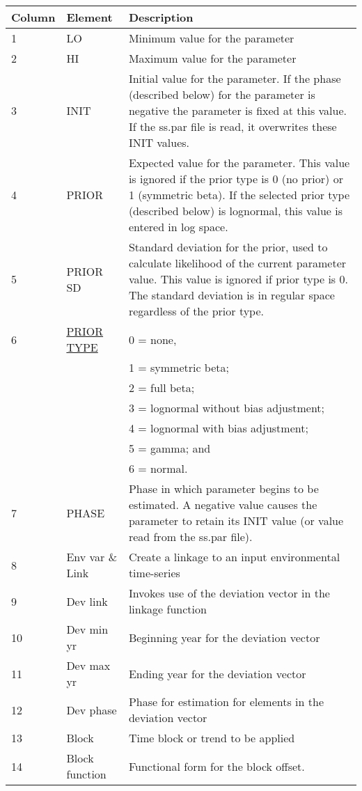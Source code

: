 \hypertarget{Priors}{} \hypertarget{paraOrder}{}
\begin{center}
	\begin{tabular}{p{2cm} p{3cm} p{10cm}}
		\hline
		Column & Element & Description \Tstrut\Bstrut\\
		\hline
		1 & LO & Minimum value for the parameter\Tstrut\\
		2 & HI & Maximum value for the parameter\Tstrut\\
		3 \Tstrut & INIT & Initial value for the parameter. If the phase (described below) for the parameter is negative the parameter is fixed at this value. If the ss.par file is read, it overwrites these INIT values.\\
		4 \Tstrut & PRIOR & Expected value for the parameter.  This value is ignored if the prior type is 0 (no prior) or 1 (symmetric beta). If the selected prior type (described below) is lognormal, this value is entered in log space. \\
		5 \Tstrut & PRIOR SD & Standard deviation for the prior, used to calculate likelihood of the current parameter value. This value is ignored if prior type is 0. The standard deviation is in regular space regardless of the prior type.\\
		6 \Tstrut & \hyperlink{PriorDescrip}{PRIOR TYPE}  & 0 = none, \\
		& & 1 = symmetric beta; \\
		& & 2 = full beta; \\
		& & 3 = lognormal without bias adjustment; \\
		& & 4 = lognormal with bias adjustment; \\
		& & 5 = gamma; and \\
		& & 6 = normal. \\
		7 \Tstrut & PHASE & Phase in which parameter begins to be estimated.  A negative value causes the parameter to retain its INIT value (or value read from the ss.par file).\Bstrut\\
		8  \Tstrut & Env var \& Link & Create a linkage to an input environmental time-series\\
		9  \Tstrut & Dev link & Invokes use of the deviation vector in the linkage function \\
		10 \Tstrut & Dev min yr & Beginning year for the deviation vector \\
		11 \Tstrut & Dev max yr & Ending year for the deviation vector\\
		12 \Tstrut & Dev phase & Phase for estimation for elements in the deviation vector \\
		13 \Tstrut & Block & Time block or trend to be applied \\
		14 \Tstrut & Block function & Functional form for the block offset. \Bstrut\\
		\hline
	\end{tabular}
\end{center}


